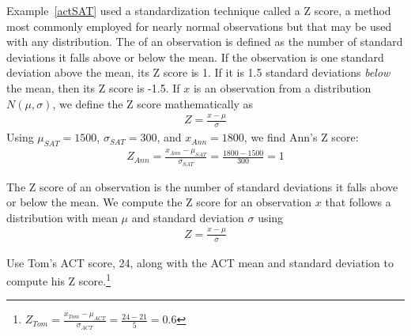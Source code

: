 Example~\ref{actSAT} used a standardization technique called a Z score, a method most commonly employed for nearly normal observations but that may be used with any distribution. The  of an observation is defined as the number of standard deviations it falls above or below the mean. If the observation is one standard deviation above the mean, its Z score is 1. If it is 1.5 standard deviations \emph{below} the mean, then its Z score is -1.5. If $x$ is an observation from a distribution $N(\mu, \sigma)$, we define the Z score mathematically as
\begin{eqnarray*}
Z = \frac{x-\mu}{\sigma}
\end{eqnarray*}
Using $\mu_{SAT}=1500$, $\sigma_{SAT}=300$, and $x_{Ann}=1800$, we find Ann's Z score:
\begin{eqnarray*}
Z_{Ann} = \frac{x_{Ann} - \mu_{SAT}}{\sigma_{SAT}} = \frac{1800-1500}{300} = 1
\end{eqnarray*}

\begin{termBox}{
The Z score of an observation is the number of standard deviations it falls above or below the mean. We compute the Z score for an observation $x$ that follows a distribution with mean $\mu$ and standard deviation $\sigma$ using
\begin{eqnarray*}
Z = \frac{x-\mu}{\sigma}
\end{eqnarray*}}
\end{termBox}

\begin{exercise}
Use Tom's ACT score, 24, along with the ACT mean and standard deviation to compute his Z score.\footnote{$Z_{Tom} = \frac{x_{Tom} - \mu_{ACT}}{\sigma_{ACT}} = \frac{24 - 21}{5} = 0.6$}
\end{exercise}

